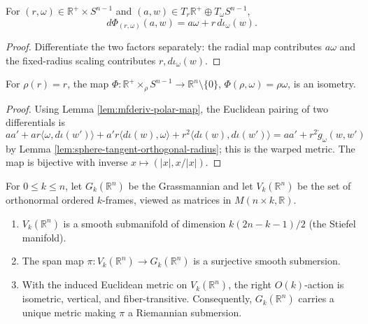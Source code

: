 \begin{lemma}
\label{lem:mfderiv-polar-map}





For $(r,\omega)\in\mathbb R^+\times S^{n-1}$ and $(a,w)\in T_r\mathbb R^+\oplus T_\omega S^{n-1}$,
\[
d\Phi_{(r,\omega)}(a,w)=a\omega+r\,d\iota_\omega(w).
\]
\end{lemma}

\begin{proof}

\sketch Differentiate the two factors separately: the radial map contributes $a\omega$ and the fixed-radius scaling contributes $r,d\iota_\omega(w)$.
\end{proof}

\begin{proposition}\label{prop:warped-product-isometry}


For $\rho(r)=r$, the map
$\Phi:\mathbb R^+\times_\rho S^{n-1}\to\mathbb R^n\setminus\{0\}$,
$\Phi(\rho,\omega)=\rho\omega$, is an isometry.
\end{proposition}

\begin{proof}

\sketch Using Lemma \ref{lem:mfderiv-polar-map}, the Euclidean pairing of two differentials is
\[
aa'+ar\langle\omega,d\iota(w')\rangle+a'r\langle d\iota(w),\omega\rangle+r^2\langle d\iota(w),d\iota(w')\rangle
=aa'+r^2\mathring g_\omega(w,w')
\]
by Lemma \ref{lem:sphere-tangent-orthogonal-radius}; this is the warped metric. The map is bijective with inverse $x\mapsto(|x|,x/|x|)$.
\end{proof}

\begin{proposition}\label{prop:grassmann-stiefel-manifolds}
For $0\le k\le n$, let $G_k(\mathbb R^n)$ be the Grassmannian and let $V_k(\mathbb R^n)$ be the set of orthonormal ordered $k$-frames, viewed as matrices in $M(n\times k,\mathbb R)$.
\begin{enumerate}
\item[(a)] $V_k(\mathbb R^n)$ is a smooth submanifold of dimension
$k(2n-k-1)/2$ (the Stiefel manifold).
\item[(b)] The span map $\pi:V_k(\mathbb R^n)\to G_k(\mathbb R^n)$ is a
surjective smooth submersion.
\item[(c)] With the induced Euclidean metric on $V_k(\mathbb R^n)$, the right
$O(k)$-action is isometric, vertical, and fiber-transitive. Consequently,
$G_k(\mathbb R^n)$ carries a unique metric making $\pi$ a Riemannian
submersion.
\end{enumerate}
\end{proposition}

